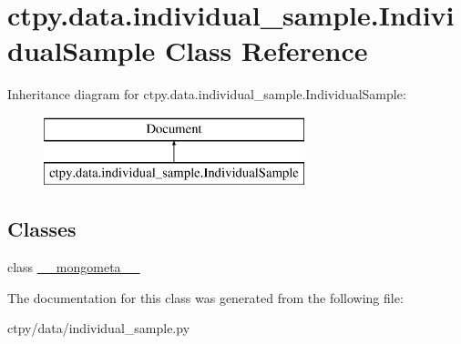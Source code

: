\hypertarget{classctpy_1_1data_1_1individual__sample_1_1_individual_sample}{\section{ctpy.\-data.\-individual\-\_\-sample.\-Individual\-Sample Class Reference}
\label{classctpy_1_1data_1_1individual__sample_1_1_individual_sample}
}
Inheritance diagram for ctpy.\-data.\-individual\-\_\-sample.\-Individual\-Sample\-:\begin{figure}[H]
\begin{center}
\leavevmode
\includegraphics[height=2.000000cm]{classctpy_1_1data_1_1individual__sample_1_1_individual_sample}
\end{center}
\end{figure}
\subsection*{Classes}
\begin{DoxyCompactItemize}
\item 
class \hyperlink{classctpy_1_1data_1_1individual__sample_1_1_individual_sample_1_1____mongometa____}{\-\_\-\-\_\-mongometa\-\_\-\-\_\-}
\end{DoxyCompactItemize}


The documentation for this class was generated from the following file\-:\begin{DoxyCompactItemize}
\item 
ctpy/data/individual\-\_\-sample.\-py\end{DoxyCompactItemize}

